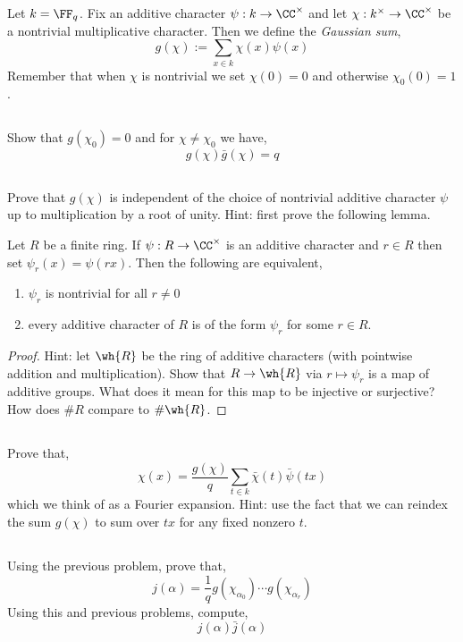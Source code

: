\documentclass[12pt]{article}
\begin{document}
Let $k = \FF_q$. Fix an additive character $\psi : k \to \CC^\times$ and let $\chi :  k^\times \to \CC^\times$ be a nontrivial multiplicative character. Then we define the \textit{Gaussian sum},
\[ g(\chi) := \sum_{x \in k} \chi(x) \psi(x) \]
Remember that when $\chi$ is nontrivial we set $\chi(0) = 0$ and otherwise $\chi_0(0) = 1$. 

\subsection{}

Show that $g(\chi_0) = 0$ and for $\chi \neq \chi_0$ we have,
\[ g(\chi) \bar{g}(\chi) = q \]

\subsection{}

Prove that $g(\chi)$ is independent of the choice of nontrivial additive character $\psi$ up to multiplication by a root of unity. Hint: first prove the following lemma.

\begin{lemma}
Let $R$ be a finite ring. If $\psi : R \to \CC^\times$ is an additive character and $r \in R$ then set $\psi_r(x) = \psi(rx)$. Then the following are equivalent,
\begin{enumerate}
\item $\psi_r$ is nontrivial for all $r \neq 0$
\item every additive character of $R$ is of the form $\psi_r$ for some $r \in R$.
\end{enumerate}
\end{lemma} 

\begin{proof}
Hint: let $\wh{R}$ be the ring of additive characters (with pointwise addition and multiplication). Show that $R \to \wh{R}$ via $r \mapsto \psi_r$ is a map of additive groups. What does it mean for this map to be injective or surjective? How does $\# R$ compare to $\# \wh{R}$.
\end{proof}

\subsection{}

Prove that,
\[ \chi(x) = \frac{g(\chi)}{q} \sum_{t \in k} \bar{\chi}(t) \bar{\psi}(tx) \]
which we think of as a Fourier expansion. Hint: use the fact that we can reindex the sum $g(\chi)$ to sum over $t x$ for any fixed nonzero $t$.

\subsection{} \label{computing_j}

Using the previous problem, prove that,
\[ j(\alpha) = \frac{1}{q} g(\chi_{\alpha_0}) \cdots g(\chi_{\alpha_r}) \]
Using this and previous problems, compute,
\[ j(\alpha) \bar{j}(\alpha) \]
\end{document}
